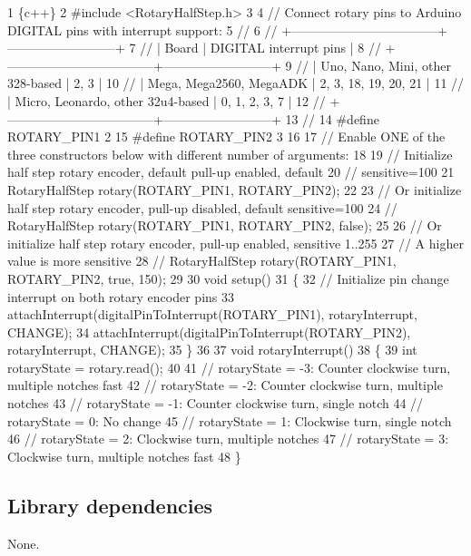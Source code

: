 \begin{DoxyCode}
1 \{c++\}
2 #include <RotaryHalfStep.h>
3 
4 // Connect rotary pins to Arduino DIGITAL pins with interrupt support:
5 //
6 // +-----------------------------------+--------------------------+
7 // |              Board                |  DIGITAL interrupt pins  |
8 // +-----------------------------------+--------------------------+
9 // | Uno, Nano, Mini, other 328-based  |  2, 3                    |
10 // | Mega, Mega2560, MegaADK           |  2, 3, 18, 19, 20, 21    |
11 // | Micro, Leonardo, other 32u4-based |  0, 1, 2, 3, 7           |
12 // +-----------------------------------+--------------------------+
13 //
14 #define ROTARY\_PIN1   2
15 #define ROTARY\_PIN2   3
16 
17 // Enable ONE of the three constructors below with different number of arguments:
18 
19 // Initialize half step rotary encoder, default pull-up enabled, default 
20 // sensitive=100
21 RotaryHalfStep rotary(ROTARY\_PIN1, ROTARY\_PIN2);
22 
23 // Or initialize half step rotary encoder, pull-up disabled, default sensitive=100
24 // RotaryHalfStep rotary(ROTARY\_PIN1, ROTARY\_PIN2, false);
25 
26 // Or initialize half step rotary encoder, pull-up enabled, sensitive 1..255
27 // A higher value is more sensitive
28 // RotaryHalfStep rotary(ROTARY\_PIN1, ROTARY\_PIN2, true, 150);
29 
30 void setup()
31 \{
32   // Initialize pin change interrupt on both rotary encoder pins
33   attachInterrupt(digitalPinToInterrupt(ROTARY\_PIN1), rotaryInterrupt, CHANGE);
34   attachInterrupt(digitalPinToInterrupt(ROTARY\_PIN2), rotaryInterrupt, CHANGE);
35 \}
36 
37 void rotaryInterrupt()
38 \{
39   int rotaryState = rotary.read();
40 
41   // rotaryState = -3: Counter clockwise turn, multiple notches fast
42   // rotaryState = -2: Counter clockwise turn, multiple notches
43   // rotaryState = -1: Counter clockwise turn, single notch
44   // rotaryState = 0:  No change
45   // rotaryState = 1:  Clockwise turn, single notch
46   // rotaryState = 2:  Clockwise turn, multiple notches
47   // rotaryState = 3:  Clockwise turn, multiple notches fast
48 \}
\end{DoxyCode}


\subsection*{Library dependencies}


\begin{DoxyItemize}
\item None.
\end{DoxyItemize}

